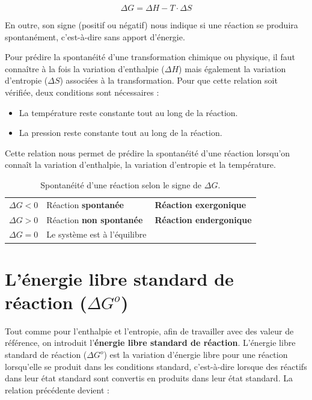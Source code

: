 \documentclass[
  11pt,
  french,
  a4paper,
  openany]{book}
\providecommand{\tightlist}{%
  \setlength{\itemsep}{0pt}\setlength{\parskip}{0pt}}
\begin{document}
\[
\Delta G = \Delta H - T \cdot \Delta S
\]

En outre, son signe (positif ou négatif) nous indique si une réaction se produira spontanément, c'est-à-dire sans apport d'énergie.

\clearpage

Pour prédire la spontanéité d'une transformation chimique ou physique, il faut connaître à la fois la variation d'enthalpie (\(\Delta H\)) mais également la variation d'entropie (\(\Delta S\)) associées à la transformation. Pour que cette relation soit vérifiée, deux conditions sont nécessaires :

\begin{itemize}
\tightlist
\item
  La température reste constante tout au long de la réaction.
\item
  La pression reste constante tout au long de la réaction.
\end{itemize}

Cette relation nous permet de prédire la spontanéité d'une réaction lorsqu'on connaît la variation d'enthalpie, la variation d'entropie et la température.

\begin{longtable}[]{@{}cll@{}}
\caption{\label{tab:spontaneitedHdS} Spontanéité d'une réaction selon le signe de \(\Delta G\).}\tabularnewline
\toprule
\endhead
\(\Delta G < 0\) & Réaction \textbf{spontanée} & \textbf{Réaction exergonique}\tabularnewline
\(\Delta G > 0\) & Réaction \textbf{non spontanée} & \textbf{Réaction endergonique}\tabularnewline
\(\Delta G = 0\) & Le système est à l'équilibre &\tabularnewline
\bottomrule
\end{longtable}

\hypertarget{luxe9nergie-libre-standard-de-ruxe9action-delta-go}{%
\section{\texorpdfstring{L'énergie libre standard de réaction (\(\Delta G^o\))}{L'énergie libre standard de réaction (\textbackslash Delta G\^{}o)}}\label{luxe9nergie-libre-standard-de-ruxe9action-delta-go}}

Tout comme pour l'enthalpie et l'entropie, afin de travailler avec des valeur de référence, on introduit l'\textbf{énergie libre standard de réaction}. L'énergie libre standard de réaction (\(\Delta G^o\)) est la variation d'énergie libre pour une réaction lorsqu'elle se produit dans les conditions standard, c'est-à-dire lorsque des réactifs dans leur état standard sont convertis en produits dans leur état standard. La relation précédente devient :
\end{document}
